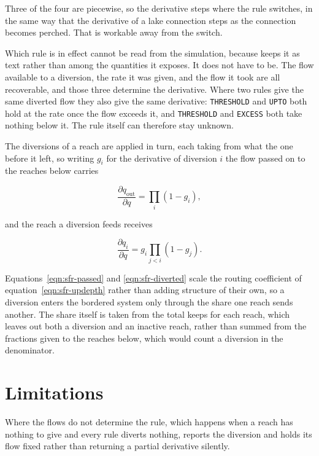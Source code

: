 Three of the four are piecewise, so the derivative steps where the rule switches, in the same way that the derivative of a lake connection steps as the connection becomes perched. That is workable away from the switch.

Which rule is in effect cannot be read from the simulation, because \mf{} keeps it as text rather than among the quantities it exposes. It does not have to be. The flow available to a diversion, the rate it was given, and the flow it took are all recoverable, and those three determine the derivative. Where two rules give the same diverted flow they also give the same derivative: \texttt{THRESHOLD} and \texttt{UPTO} both hold at the rate once the flow exceeds it, and \texttt{THRESHOLD} and \texttt{EXCESS} both take nothing below it. The rule itself can therefore stay unknown.

The diversions of a reach are applied in turn, each taking from what the one before it left, so writing $g_{i}$ for the derivative of diversion $i$ the flow passed on to the reaches below carries

\begin{equation}
	\label{eqn:sfr-passed}
	\frac{\partial q_{\mathrm{out}}}{\partial q} = \prod_{i} \left( 1 - g_{i} \right),
\end{equation}

\noindent and the reach a diversion feeds receives

\begin{equation}
	\label{eqn:sfr-diverted}
	\frac{\partial q_{i}}{\partial q} = g_{i} \prod_{j < i} \left( 1 - g_{j} \right).
\end{equation}

Equations~\ref{eqn:sfr-passed} and \ref{eqn:sfr-diverted} scale the routing coefficient of equation~\ref{eqn:sfr-updepth} rather than adding structure of their own, so a diversion enters the bordered system only through the share one reach sends another. The share itself is taken from the total \mf{} keeps for each reach, which leaves out both a diversion and an inactive reach, rather than summed from the fractions given to the reaches below, which would count a diversion in the denominator.

\section*{Limitations}

Where the flows do not determine the rule, which happens when a reach has nothing to give and every rule diverts nothing, \adj{} reports the diversion and holds its flow fixed rather than returning a partial derivative silently.
